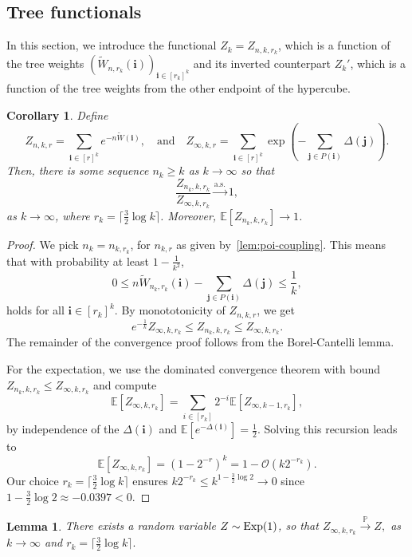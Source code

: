 \documentclass[11pt]{article}
\newtheorem{lemma}[theorem]{Lemma}
\newtheorem{corollary}[theorem]{Corollary}
\theoremstyle{definition}
\theoremstyle{remark}
\theoremstyle{remark}
\numberwithin{theorem}{section}
\providecommand{\P}{}
\renewcommand{\P}{\mathbb{P}}
\newcommand{\E}{\mathbb{E}}
\newcommand{\bigO}{\mathcal{O}}
\begin{document}
\subsection{Tree functionals}
In this section, we introduce the functional $Z_k=Z_{n,k,r_k}$, which is a function of the tree weights $(\widetilde{W}_{n,r_k}(\bm i))_{\bm i\in[r_k]^k}$ and its inverted counterpart $Z_k'$, which is a function of the tree weights from the other endpoint of the hypercube.
\begin{corollary}\label{lem:exp-limit1}
    Define
    \[
    Z_{n,k,r}=\sum_{\bm{i}\in [r]^k}e^{-n\widetilde{W}(\bm{i})},\quad\text{and}\quad Z_{\infty,k,r}=\sum_{\bm{i}\in [r]^k}\exp\left(-\sum_{\bm{j}\in P(\bm{i})}\Delta(\bm{j})\right).
    \]
    Then, there is some sequence $n_k\ge k$ as $k\to\infty$ so that
    \[
    \frac{Z_{n_k,k,r_k}}{Z_{\infty,k,r_k}}\stackrel{\text{a.s.}}\to1,
    \]
    as $k\to\infty$, where $r_k=\lceil\frac{3}{2}\log k\rceil$. Moreover, $\E[Z_{n_k,k,r_k}]\to1$.
\end{corollary}
\begin{proof}
    We pick $n_k=n_{k,r_k}$, for $n_{k,r}$ as given by~\cref{lem:poi-coupling}.
    This means that with probability at least $1-\frac1{k^2}$,
    \[
    0\le n\widetilde W_{n_k,r_k}(\bm i)-\sum_{\bm j\in P(\bm i)}\Delta(\bm j)\le \frac1k,
    \]
    holds for all $\bm i\in [r_k]^k.$
    By monototonicity of $Z_{n,k,r}$, we get
    \[
    e^{-\frac1k}Z_{\infty,k,r_k}\le Z_{n_k,k,r_k}\le Z_{\infty,k,r_k}.
    \]
    The remainder of the convergence proof follows from the Borel-Cantelli lemma.
    
    For the expectation, we use the dominated convergence theorem with bound $Z_{n_k,k,r_k}\le Z_{\infty,k,r_k}$ and compute
    \[
    \E[Z_{\infty,k,r_k}]=\sum_{i \in [r_k]}2^{-i}\E[Z_{\infty,k-1,r_k}],
    \]
    by independence of the $\Delta(\bm i)$ and $\E[e^{-\Delta(\bm i)}]=\frac12$. Solving this recursion leads to
    \[
    \E[Z_{\infty,k,r_k}]=\left(1-2^{-r}\right)^k=1-\bigO(k2^{-r_k}).
    \]
    Our choice $r_k=\lceil \frac32\log k\rceil$ ensures $k2^{-r_k}\le k^{1-\frac32\log2}\to0$ since $1-\frac32\log2\approx -0.0397<0$. 
\end{proof}


\begin{lemma}\label{lem:exp-limit2}
    There exists a random variable $Z\sim\textup{Exp}(1)$, so that
    \(
    Z_{\infty,k,r_k}\stackrel{\P}\to Z,
    \)
    as $k\to\infty$ and ${r_k=\lceil\frac32\log k\rceil}.$
\end{lemma}
\end{document}
